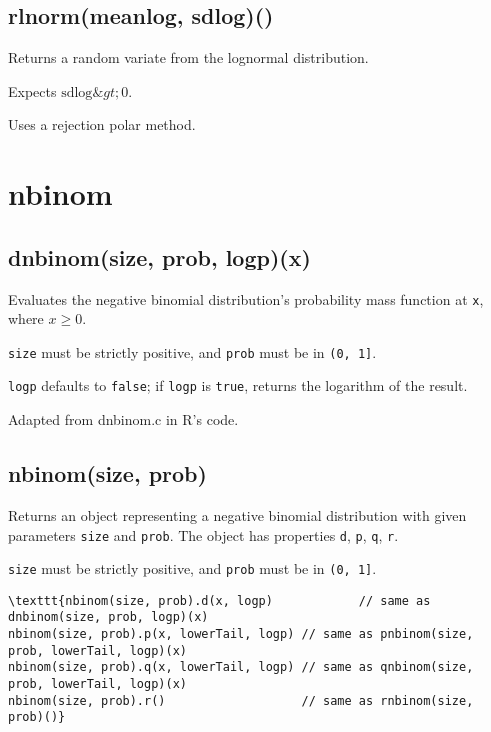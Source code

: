 \documentclass{article}
\begin{document}
    \subsection*{rlnorm(meanlog, sdlog)()}
    Returns a random variate from the lognormal distribution.


Expects $\textrm{sdlog} \&gt; 0$.


Uses a rejection polar method.


  \section{nbinom}
    \subsection*{dnbinom(size, prob, logp)(x)}
    Evaluates the negative binomial distribution's probability mass function
at \texttt{x}, where $x \geq 0$.


\texttt{size} must be strictly positive, and \texttt{prob} must be in \texttt{(0, 1]}.


\texttt{logp} defaults to \texttt{false}; if \texttt{logp} is \texttt{true}, returns the
logarithm of the result.


Adapted from dnbinom.c in R's code.


    \subsection*{nbinom(size, prob)}
    Returns an object representing a negative binomial distribution with
given parameters \texttt{size} and \texttt{prob}.  The object has
properties \texttt{d}, \texttt{p}, \texttt{q}, \texttt{r}.


\texttt{size} must be strictly positive, and \texttt{prob} must be in \texttt{(0, 1]}.


\begin{lstlisting}
\texttt{nbinom(size, prob).d(x, logp)            // same as dnbinom(size, prob, logp)(x)
nbinom(size, prob).p(x, lowerTail, logp) // same as pnbinom(size, prob, lowerTail, logp)(x)
nbinom(size, prob).q(x, lowerTail, logp) // same as qnbinom(size, prob, lowerTail, logp)(x)
nbinom(size, prob).r()                   // same as rnbinom(size, prob)()}\end{lstlisting}
\end{document}
